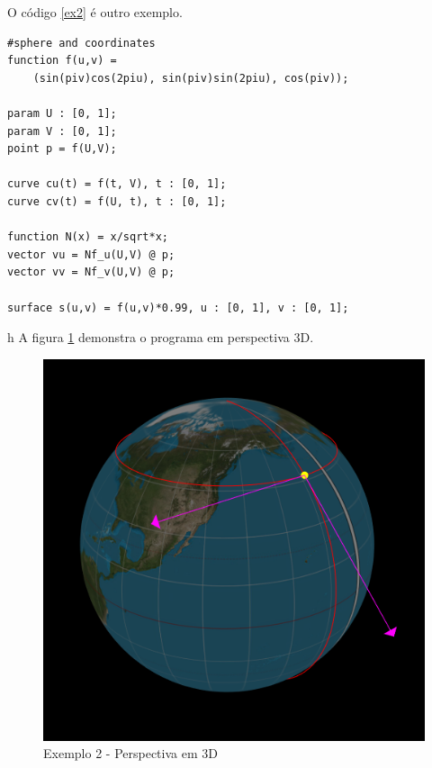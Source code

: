 O código \ref{ex2} é outro exemplo.
\begin{lstlisting}[caption=Exemplo de objetos,label=ex2]
#sphere and coordinates
function f(u,v) = 
    (sin(piv)cos(2piu), sin(piv)sin(2piu), cos(piv));

param U : [0, 1];
param V : [0, 1];
point p = f(U,V);

curve cu(t) = f(t, V), t : [0, 1];
curve cv(t) = f(U, t), t : [0, 1];

function N(x) = x/sqrt*x;
vector vu = Nf_u(U,V) @ p;
vector vv = Nf_v(U,V) @ p;

surface s(u,v) = f(u,v)*0.99, u : [0, 1], v : [0, 1];
\end{lstlisting}

h
A figura \ref{img:ex2} demonstra o programa em perspectiva 3D.
\begin{figure}[!ht]
    \includegraphics[width=\linewidth]{ex2.png}
    \caption{Exemplo 2 - Perspectiva em 3D}
    \label{img:ex2}
\end{figure}

